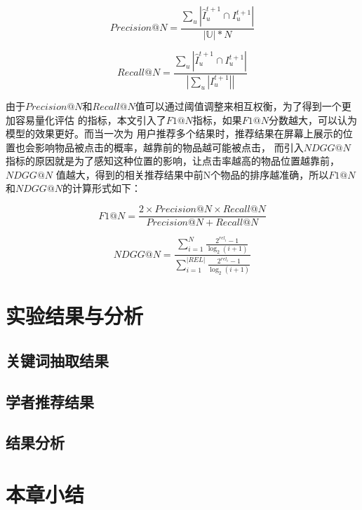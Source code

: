 \begin{equation}
Precision@N=\frac{\sum_{u}|\hat{I}_{u}^{t+1}\cap I_{u}^{t+1} |}{\left | \mathbb{U} \right |*N}
\end{equation}

\begin{equation}
Recall@N=\frac{\sum_{u}|\hat{I}_{u}^{t+1}\cap I_{u}^{t+1} |}{\left |\sum_{u}|I_{u}^{t+1}| \right |}
\end{equation}

由于$Precision@N$和$Recall@N$值可以通过阈值调整来相互权衡，为了得到一个更加容易量化评估%
的指标，本文引入了$F1@N$指标，如果$F1@N$分数越大，可以认为模型的效果更好。而当一次为%
用户推荐多个结果时，推荐结果在屏幕上展示的位置也会影响物品被点击的概率，越靠前的物品越可能被点击，%
而引入$NDGG@N$指标的原因就是为了感知这种位置的影响，让点击率越高的物品位置越靠前，$NDGG@N$%
值越大，得到的相关推荐结果中前N个物品的排序越准确，所以$F1@N$和$NDGG@N$的计算形式如下：

\begin{equation}
F1@N=\frac{2\times Precision@N\times Recall@N}{Precision@N+Recall@N}
\end{equation}

\begin{equation}
NDGG@N = \frac{\sum_{i=1}^{N} \frac{2^{r e l_{i}}-1}{\log _{2}(i+1)}}{\sum_{i=1}^{|R E L|} \frac{2^{r e l_{i}}-1}{\log _{2}(i+1)}}
\end{equation}


\section{实验结果与分析}

\subsection{关键词抽取结果}



\subsection{学者推荐结果}




\subsection{结果分析}

\section{本章小结}



